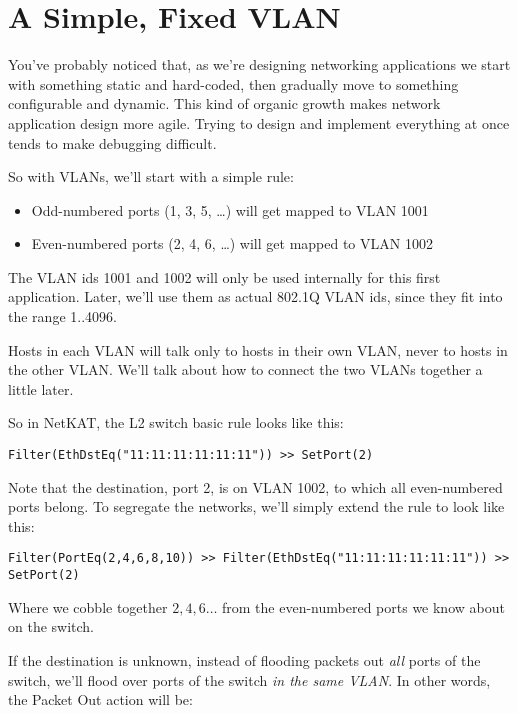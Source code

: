 \section{A Simple, Fixed VLAN}

You've probably noticed that, as we're designing networking applications we start with something 
static and hard-coded, then gradually move to something configurable and dynamic.  This kind of 
organic growth makes network application design more agile.  Trying to design and implement everything
at once tends to make debugging difficult.

So with VLANs, we'll start with a simple rule:

\begin{itemize}
\item Odd-numbered ports (1, 3, 5, \ldots) will get mapped to VLAN 1001
\item Even-numbered ports (2, 4, 6, \ldots) will get mapped to VLAN 1002
\end{itemize}

The VLAN ids 1001 and 1002 will only be used internally for this first application.  Later, we'll use
them as actual 802.1Q VLAN ids, since they fit into the range 1..4096.  

Hosts in each VLAN will talk only to hosts in their own VLAN, never to hosts in the other VLAN.  We'll talk
about how to connect the two VLANs together a little later.  

So in NetKAT, the L2 switch basic rule looks like this:

\begin{verbatim}
Filter(EthDstEq("11:11:11:11:11:11")) >> SetPort(2)
\end{verbatim}

Note that the destination, port 2, is on VLAN 1002, to which all even-numbered ports belong.  
To segregate the networks, we'll simply extend the rule to look like this:

\begin{verbatim}
Filter(PortEq(2,4,6,8,10)) >> Filter(EthDstEq("11:11:11:11:11:11")) >> SetPort(2)
\end{verbatim}

Where we cobble together $2, 4, 6\ldots$ from the even-numbered ports we know about on the switch.  

If the destination is unknown, instead of flooding packets out \emph{all} ports of the switch, 
we'll flood over ports of the switch \emph{in the same VLAN}.  In other words, the Packet Out action will be:

